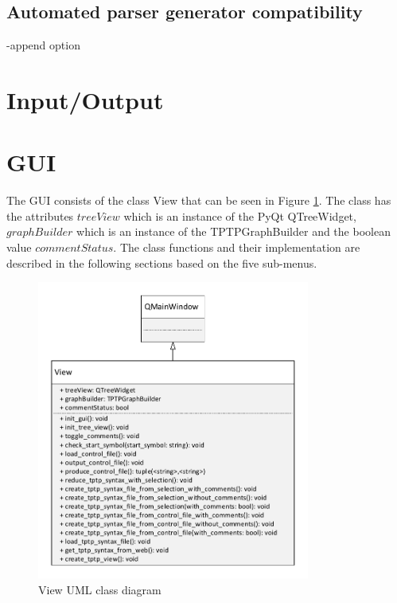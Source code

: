 \subsection{Automated parser generator compatibility}\label{sec:ImplementationAutomatedParserGenerator}
-append option

\section{Input/Output}\label{sec:ImplementationInOut}

\section{GUI}\label{sec:ImplementationGUI}
The GUI consists of the class View that can be seen in Figure \ref{fig:ImplementationViewClassDiagram}. The class has the attributes $treeView$ which is an instance of the PyQt QTreeWidget, $graphBuilder$ which is an instance of the TPTPGraphBuilder and the boolean value $commentStatus$. The class functions and their implementation are described in the following sections based on the five sub-menus.

\begin{figure}[H]
\centering
\includegraphics[width=0.8\textwidth]{images/Implementation_view_class_diagramm.pdf}
\caption{View UML class diagram}
\label{fig:ImplementationViewClassDiagram}
\end{figure}

